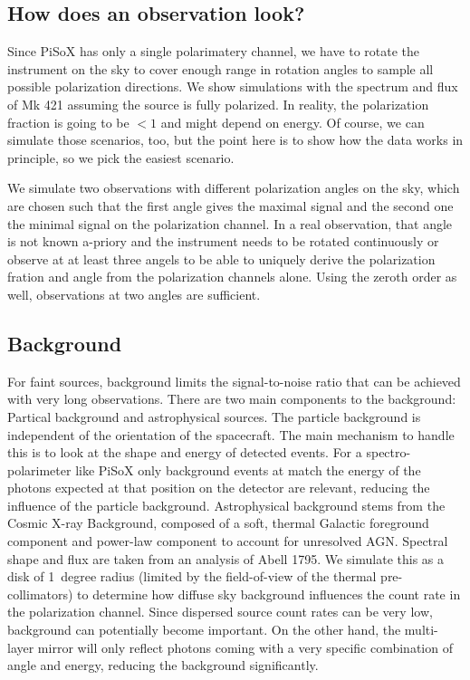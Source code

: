 \documentclass[]{spie}  %
\begin{document}
\subsection{How does an observation look?}
Since PiSoX has only a single polarimatery channel, we have to rotate
the instrument on the sky to cover enough range in rotation angles to
sample all possible polarization directions. We show simulations with
the spectrum and flux of Mk 421 assuming the source is fully
polarized. In reality, the polarization fraction is going to be $<1$
and might depend on energy. Of course, we can simulate those
scenarios, too, but the point here is to show how the data works in
principle, so we pick the easiest scenario.

We simulate two observations with different polarization angles on the
sky, which are chosen such that the first angle gives the maximal
signal and the second one the minimal signal on the polarization
channel. In a real observation, that angle is not known a-priory and
the instrument needs to be rotated continuously or observe at at least
three angels to be able to uniquely derive the polarization fration
and angle from the polarization channels alone. Using the zeroth order
as well, observations at two angles are sufficient.

\subsection{Background}
For faint sources, background limits the signal-to-noise ratio that
can be achieved with very long observations. There are two main
components to the background: Partical background and astrophysical
sources. The particle background is independent of the orientation of
the spacecraft. The main mechanism to handle this is to look at the
shape and energy of detected events. For a spectro-polarimeter like
PiSoX only background events at match the energy of the photons
expected at that position on the detector are relevant, reducing the
influence of the particle background. Astrophysical background stems
from the Cosmic X-ray Background, composed of a soft, thermal Galactic
foreground component and power-law component to account for unresolved
AGN. Spectral shape and flux are taken from an analysis of Abell
1795\cite{2009PASJ...61.1117B}.  We simulate this as a disk of
1~degree radius (limited by the field-of-view of the thermal
pre-collimators) to determine how diffuse sky background influences
the count rate in the polarization channel. Since
dispersed source count rates can be very low, background can
potentially become important. On the other hand, the multi-layer
mirror will only reflect photons coming with a very specific
combination of angle and energy, reducing the background
significantly.
\end{document}

